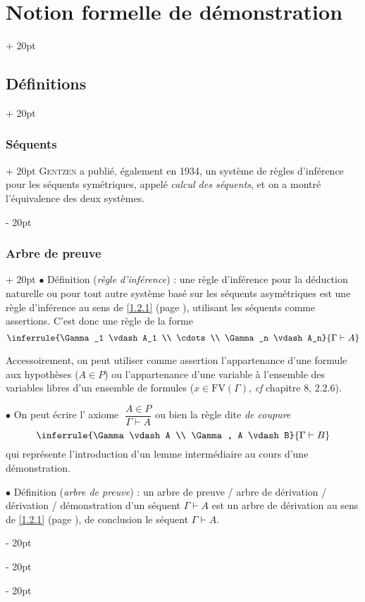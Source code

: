 \documentclass[a4paper, 12pt, twoside]{article}
\newcommand{\simplecit}[1]{\guillemotleft$\;$#1$\;$\guillemotright}
\newcommand{\ind}[1][20pt]{\advance\leftskip + #1}
\newcommand{\deind}[1][20pt]{\advance\leftskip - #1}
\newenvironment{indt}[2][20pt]{#2 \par \ind[#1]}{\par \deind} %
\begin{document}
\begin{indt}{\section{Notion formelle de démonstration}}
\begin{indt}{\subsection{Définitions}}
\begin{indt}{\subsubsection{Séquents}}
                \textsc{Gentzen} a publié, également en 1934, un système de règles d'inférence pour les séquents symétriques, appelé \emph{calcul des séquents}, et on a montré l'équivalence des deux systèmes.
            \end{indt}

            \vspace{12pt}
            
            \begin{indt}{\subsubsection{Arbre de preuve}}
                $\bullet$ Définition (\emph{règle d'inférence}) : une règle d'inférence pour la déduction naturelle ou pour tout autre système basé sur les séquents asymétriques est une règle d'inférence au sens de \ref{1.2.1} (page \pageref{1.2.1}), utilisant les séquents comme assertions.
                C'est donc une règle de la forme
                \[
                    \inferrule{\Gamma_1 \vdash A_1 \\ \cdots \\ \Gamma_n \vdash A_n}{\Gamma \vdash A}
                \]

                Accessoirement, on peut utiliser comme assertion l'appartenance d'une formule aux hypothèses ($A \in P$) ou l'appartenance d'une variable à l'ensemble des variables libres d'un ensemble de formules ($x \in \mathrm{FV}(\Gamma)$, \textit{cf} chapitre 8, 2.2.6).

                \vspace{12pt}
                
                $\bullet$ On peut écrire l'\simplecit{axiome} $\dfrac{A \in P}{\Gamma \vdash A}$ ou bien la règle dite \emph{de coupure}
                \[
                    \inferrule{\Gamma \vdash A \\ \Gamma, A \vdash B}{\Gamma \vdash B}
                \]
                qui représente l'introduction d'un lemme intermédiaire au cours d'une démonstration.

                \vspace{12pt}
                
                $\bullet$ Définition (\emph{arbre de preuve}) : un arbre de preuve / arbre de dérivation / dérivation / démonstration d'un séquent $\Gamma \vdash A$ est un arbre de dérivation au sens de \ref{1.2.1} (page \pageref{1.2.1}), de conclusion le séquent $\Gamma \vdash A$.


\end{indt}
\end{indt}
\end{indt}
\end{document}
